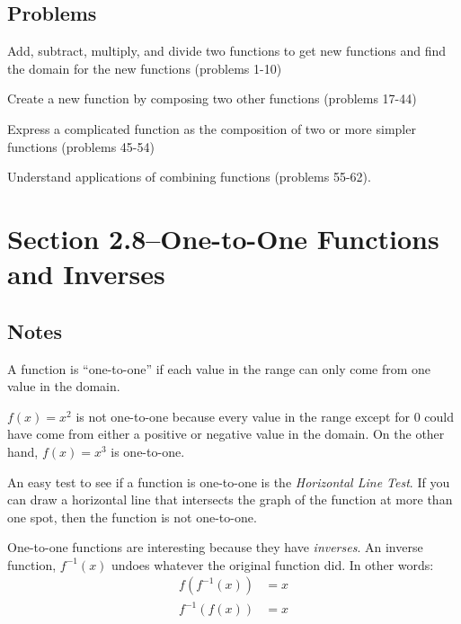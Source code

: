 \documentclass{article}
\begin{document}
\subsection{Problems}

\begin{itemize*}
  \item Add, subtract, multiply, and divide two functions to get new functions and find the domain for the new functions
    (problems 1-10)

  \item Create a new function by composing two other functions (problems 17-44)

  \item Express a complicated function as the composition of two or more simpler functions (problems 45-54)

  \item Understand applications of combining functions (problems 55-62).
\end{itemize*}

\section{Section 2.8--One-to-One Functions and Inverses}

\subsection{Notes}

A function is ``one-to-one'' if each value in the range can only come from one value in the domain.  

$f(x) = x^2$ is not one-to-one because every value in the range except for 0 could have come from either a positive or
negative value in the domain.  On the other hand, $f(x) = x^3$ is one-to-one.

An easy test to see if a function is one-to-one is the {\em Horizontal Line Test}.  If you can draw a horizontal
line that intersects the graph of the function at more than one spot, then the function is not one-to-one.

One-to-one functions are interesting because they have {\em inverses}.  An inverse function, $f^{-1}(x)$ undoes whatever
the original function did.  In other words:
\begin{align*}
  f(f^{-1}(x)) &= x \\
  f^{-1}(f(x)) &= x \\
\end{align*}
\end{document}
